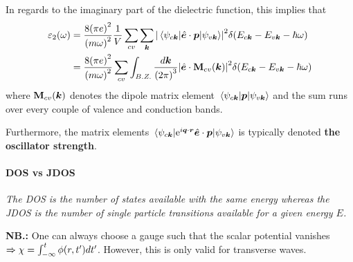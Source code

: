 In regards to the imaginary part of the dielectric function, this implies that
\begin{equation}
\begin{split}
    \varepsilon_2\qty(\omega) &= \dfrac{8\qty(\pi e)^2 }{\qty(m \omega)^2} \dfrac{1}{V} \sum_{cv} \sum_{\bm{k}} \abs{\mel{\psi_{c\bm{k}}}{\hat{\bm{e}}\cdot \bm{p}}{\psi_{v\bm{k}}}}^2 \delta \qty(E_{c\bm{k}} - E_{v\bm{k}} - \hbar \omega) \\
    &= \dfrac{8\qty(\pi e)^2 }{\qty(m \omega)^2}  \sum_{cv} \int_{B.Z.} \dfrac{d\bm{k}}{\qty(2\pi)^3} \abs{\hat{\bm{e}} \cdot \mathrm{\mathbf{M}}_{cv}\qty(\bm{k})}^2\delta \qty(E_{c\bm{k}} - E_{v\bm{k}} - \hbar \omega )
\end{split}
\end{equation}
where $\mathrm{\mathbf{M}}_{cv}\qty(\bm{k})$ denotes the dipole matrix element $\mel{\psi_{c\bm{k}}}{\bm{p}}{\psi_{v\bm{k}}}$ and the sum runs over every couple of valence and conduction bands. 

Furthermore, the matrix elements $  \mel{\psi_{c\bm{k}}}{\mathrm{e}^{i \bm{q}\cdot \bm{r}}\hat{\bm{e}}\cdot \bm{p}}{\psi_{v\bm{k}}}$ is typically denoted \textbf{the oscillator strength}.

\paragraph{DOS vs JDOS} \emph{The DOS is the number of states available with the same energy whereas the JDOS is the number of single particle transitions available for a given energy $E$.}

\textbf{NB.:} One can always choose a gauge such that the scalar potential vanishes $\Rightarrow \chi = \int_{-\infty}^t \phi\qty(r,t') dt'$. However, this is only valid for transverse waves.\\


